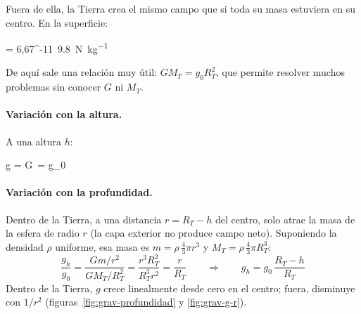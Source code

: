 Fuera de ella, la Tierra crea el mismo campo que si toda su masa estuviera en su centro. En la superficie:
\begin{centeredequation}
     = 6{,}67^{-11}\, \approx \qty{9.8}{\newton\per\kg} \label{eq:grav-g0}
\end{centeredequation}
De aquí sale una relación muy útil: \(\boxed{G M_T = g_0 R_T^2}\), que permite resolver muchos problemas sin conocer \(G\) ni
\(M_T\).

\paragraph{Variación con la altura.} A una altura \(h\):
\begin{centeredequation}
    g = G\, = g_0\, \label{eq:grav-g-altura}
\end{centeredequation}

\paragraph{Variación con la profundidad.} Dentro de la Tierra, a una distancia \(r = R_T - h\) del centro, solo atrae la
masa de la esfera de radio \(r\) (la capa exterior no produce campo neto). Suponiendo la densidad \(\rho\) uniforme, esa masa
es \(m = \rho\,\tfrac{4}{3}\pi r^3\) y \(M_T = \rho\,\tfrac{4}{3}\pi R_T^3\):
\begin{equation*}
    \dfrac{g_h}{g_0} = \dfrac{G m/r^2}{G M_T/R_T^2} = \dfrac{r^3 R_T^2}{R_T^3 r^2} = \dfrac{r}{R_T}
    \qquad\Rightarrow\qquad \boxed{g_h = g_0\,\dfrac{R_T - h}{R_T}}
\end{equation*}
Dentro de la Tierra, \(g\) crece linealmente desde cero en el centro; fuera, disminuye con \(1/r^2\)
(figuras~\ref{fig:grav-profundidad} y \ref{fig:grav-g-r}).


